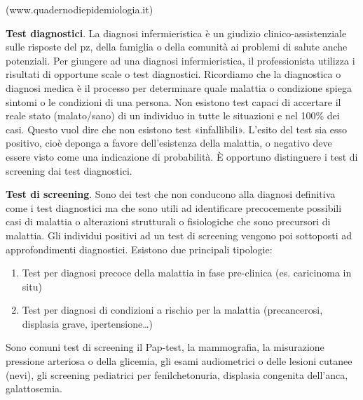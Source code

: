 \documentclass[]{book}
\begin{document}
(www.quadernodiepidemiologia.it)

\textbf{Test diagnostici}.
La diagnosi infermieristica è un giudizio clinico-assistenziale sulle risposte del pz, della famiglia o della comunità ai problemi di salute anche potenziali. Per giungere ad una diagnosi infermieristica, il professionista utilizza i risultati di opportune scale o test diagnostici. Ricordiamo che la diagnostica o diagnosi medica è il processo per determinare quale malattia o condizione spiega sintomi o le condizioni di una persona. Non esistono test capaci di accertare il reale stato (malato/sano) di un individuo in tutte le situazioni e nel 100\% dei casi. Questo vuol dire che non esistono test «infallibili». L'esito del test sia esso positivo, cioè deponga a favore dell'esistenza della malattia, o negativo deve essere visto come una indicazione di probabilità. È opportuno distinguere i test di screening dai test diagnostici.

\textbf{Test di screening}.
Sono dei test che non conducono alla diagnosi definitiva come i test diagnostici ma che sono utili ad identificare precocemente possibili casi di malattia o alterazioni strutturali o fisiologiche che sono precursori di malattia. Gli individui positivi ad un test di screening vengono poi sottoposti ad approfondimenti diagnostici. Esistono due principali tipologie:

\begin{enumerate}
\def\labelenumi{\arabic{enumi})}
\item
  Test per diagnosi precoce della malattia in fase pre-clinica (es. caricinoma in situ)
\item
  Test per diagnosi di condizioni a rischio per la malattia (precancerosi, displasia grave, ipertensione\ldots{})
\end{enumerate}

Sono comuni test di screening il Pap-test, la mammografia, la misurazione pressione arteriosa o della glicemia, gli esami audiometrici o delle lesioni cutanee (nevi), gli screening pediatrici per fenilchetonuria, displasia congenita dell'anca, galattosemia.
\end{document}
